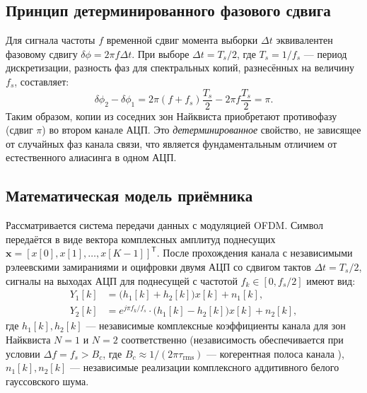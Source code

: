 \documentclass[a4paper,12pt]{article}
\numberwithin{equation}{section}
\begin{document}
\subsection{Принцип детерминированного фазового сдвига}
\label{subsec:phase_principle}

Для сигнала частоты $f$ временной сдвиг момента выборки $\Delta t$ эквивалентен фазовому сдвигу $\delta\phi = 2\pi f \Delta t$. При выборе $\Delta t = T_s/2$, где $T_s = 1/f_s$ --- период дискретизации, разность фаз для спектральных копий, разнесённых на величину $f_s$, составляет:
\begin{equation}
    \delta\phi_2 - \delta\phi_1 = 2\pi(f+f_s)\frac{T_s}{2} - 2\pi f\frac{T_s}{2} = \pi.
    \label{eq:phase_diff}
\end{equation}
Таким образом, копии из соседних зон Найквиста приобретают противофазу (сдвиг $\pi$) во втором канале АЦП. Это \textit{детерминированное} свойство, не зависящее от случайных фаз канала связи, что является фундаментальным отличием от естественного алиасинга в одном АЦП.

\subsection{Математическая модель приёмника}
\label{subsec:receiver_model}

Рассматривается система передачи данных с модуляцией OFDM. Символ передаётся в виде вектора комплексных амплитуд поднесущих $\mathbf{x} = [x[0], x[1], \dots, x[K-1]]^\mathsf{T}$. После прохождения канала с независимыми рэлеевскими замираниями и оцифровки двумя АЦП со сдвигом тактов $\Delta t = T_s/2$, сигналы на выходах АЦП для поднесущей с частотой $f_k \in [0, f_s/2]$ имеют вид:
\begin{align}
    Y_1[k] &= \bigl(h_1[k] + h_2[k]\bigr) x[k] + n_1[k], \label{eq:y1} \\
    Y_2[k] &= e^{j\pi f_k / f_s} \cdot \bigl(h_1[k] - h_2[k]\bigr) x[k] + n_2[k], \label{eq:y2}
\end{align}
где $h_1[k], h_2[k]$ --- независимые комплексные коэффициенты канала для зон Найквиста $N=1$ и $N=2$ соответственно (независимость обеспечивается при условии $\Delta f = f_s > B_c$, где $B_c \approx 1/(2\pi\tau_\text{rms})$ --- когерентная полоса канала \cite{proakis}), $n_1[k], n_2[k]$ --- независимые реализации комплексного аддитивного белого гауссовского шума.
\end{document}
